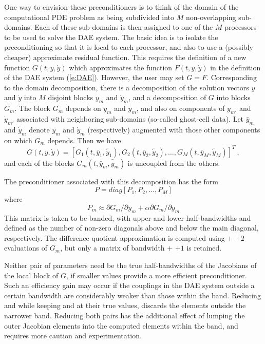 {
One way to envision these preconditioners is to think of the domain of
the computational PDE problem as being subdivided into $M$ non-overlapping
sub-domains.  Each of these sub-domains is then assigned to one of the
$M$ processors to be used to solve the DAE system. The basic idea is
to isolate the preconditioning so that it is local to each processor,
and also to use a (possibly cheaper) approximate residual
function. This requires the definition of a new function $G(t,y,\dot{y})$
which approximates the function $F(t, y, \dot{y})$ in the definition of the DAE
system (\ref{e:DAE}). However, the user may set $G = F$.  Corresponding
to the domain decomposition, there is a decomposition of the solution
vectors $y$ and $\dot{y}$ into $M$ disjoint blocks $y_m$ and $\dot{y}_m$, and a
decomposition of $G$ into blocks $G_m$.  The block $G_m$ depends on $y_m$
and $\dot{y}_m$, and also on components of $y_{m'}$ and $\dot{y}_{m'}$ associated with
neighboring sub-domains (so-called ghost-cell data).  Let $\bar{y}_m$
and $\bar{\dot{y}}_m$ denote $y_m$ and $\dot{y}_m$ (respectively) augmented
with those other components on which $G_m$ depends.  Then we have
\begin{equation}
  G(t,y,\dot{y}) = [G_1(t,\bar{y}_1,\bar{\dot{y}}_1), G_2(t,\bar{y}_2,\bar{\dot{y}}_2),
               \ldots, G_M(t,\bar{y}_M,\bar{\dot{y}}_M)]^T ~,
\end{equation}
and each of the blocks $G_m(t,\bar{y}_m,\bar{\dot{y}}_m)$ is uncoupled from
the others.

The preconditioner associated with this decomposition has the form
\begin{equation}
  P= diag[P_1, P_2, \ldots, P_M]
\end{equation}
where
\begin{equation}
  P_m \approx \partial G_m / \partial y_m
  + \alpha \partial G_m / \partial \dot{y}_m
\end{equation}
This matrix is taken to be banded, with
upper and lower half-bandwidths  and  defined as
the number of non-zero diagonals above and below the main diagonal,
respectively. The difference quotient approximation is computed using
 $+$  $+ 2$ evaluations of $G_m$, but only a matrix
of bandwidth  $+$  $+ 1$ is retained.

Neither pair of parameters need be the true half-bandwidths of the Jacobians
of the local block of $G$, if smaller values provide a more efficient
preconditioner.  Such an efficiency gain may occur if the couplings
in the DAE system outside a certain bandwidth are considerably weaker than
those within the band.  Reducing  and  while keeping
 and  at their true values, discards the elements
outside the narrower band.  Reducing both pairs has the additional
effect of lumping the outer Jacobian elements into the computed elements
within the band, and requires more caution and experimentation.

}
